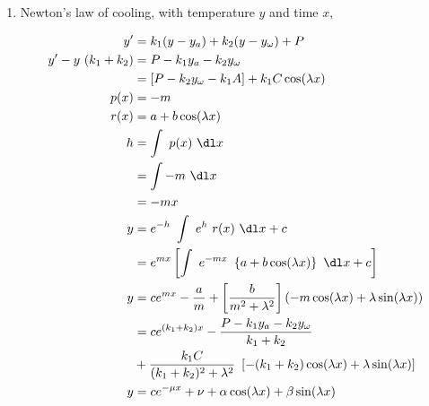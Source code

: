 \begin{enumerate}
    \item Newton's law of cooling, with temperature $ y $ and time $ x $,

          \begin{align}
              y'   & = k_{1}(y - y_{a}) + k_{2}(y - y_{\omega}) + P             \\
              y' - y\ (k_{1} + k_{2})
                   & = P - k_{1}y_{a} - k_{2}y_{\omega}                         \\
                   & = [ P - k_{2}y_{\omega} -k_{1}A ] + k_{1}C \cos(\lambda x) \\
              p(x) & = -m                                                       \\
              r(x) & = a + b\cos(\lambda x)                                     \\
              h    & = \int\ p(x)\ \dl x                                        \\
                   & = \int -m\ \dl x                                           \\
                   & = -mx                                                      \\
              y    & = e^{-h}\ \int\ e^{h}\ r(x)\ \dl x + c                     \\
                   & = e^{mx} \left[ \int\ e^{-mx}
              \ \left\{ a + b\cos (\lambda x)  \right\}\ \dl x + c \right]      \\
              y    & =  ce^{mx} -\frac{a}{m} +
              \left[ \frac{b}{m^{2}+\lambda^{2}} \right]
              \left( -m \cos (\lambda x) + \lambda \sin (\lambda x)\right)      \\
                   & = ce^{(k_{1} + k_{2})x}
              - \frac{P - k_{1}y_{a} - k_{2}y_{\omega}}{k_{1} + k_{2}}          \\
                   & + \frac{k_{1}C}{(k_{1}
                  + k_{2})^{2} + \lambda^{2}}\ \left[ -(k_{1} + k_{2})
              \cos (\lambda x) + \lambda \sin (\lambda x) \right]               \\
              y    & = ce^{-\mu x} + \nu + \alpha \cos (\lambda x)
              + \beta \sin(\lambda x)
          \end{align}


\end{enumerate}
